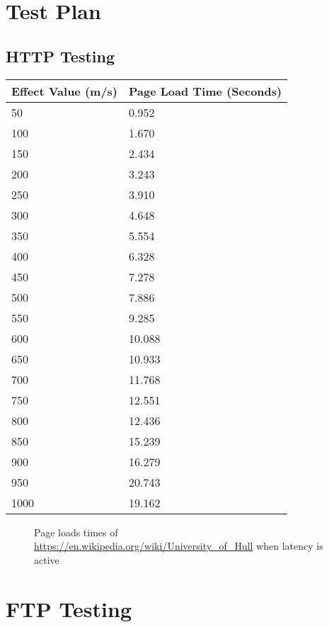 \begin{appendices}

%
\chapter{Test Plan}
\label{ref:testplan}


\begin{center}
\chapter{HTTP Testing}
\label{ref:httpTesting}


\begin{tabular}{| l | l |}
	\hline
	{\bf Effect Value (m/s)} & {\bf Page Load Time (Seconds)} \\\hline
	50					& 0.952 \\\hline
    100					& 1.670 \\\hline
	150 				& 2.434 \\\hline
	200					& 3.243 \\\hline
	250					& 3.910 \\\hline
	300 				& 4.648 \\\hline
	350					& 5.554 \\\hline
	400					& 6.328 \\\hline
	450					& 7.278 \\\hline
	500					& 7.886 \\\hline
	550					& 9.285 \\\hline
	600					& 10.088 \\\hline
	650					& 10.933 \\\hline
	700					& 11.768 \\\hline
	750					& 12.551 \\\hline
	800					& 12.436 \\\hline
	850					& 15.239 \\\hline
	900 				& 16.279 \\\hline
	950					& 20.743 \\\hline
	1000				& 19.162 \\\hline
\end{tabular}
\begin{figure}[h]
	\caption{Page loads times of \url{https://en.wikipedia.org/wiki/University_of_Hull} when latency is active}
	\label{ref:latencyHttp}
\end{figure}
\end{center}

\chapter{FTP Testing}
\label{ref:ftpTesting}
\begin{center}


\end{center}
\end{appendices}
